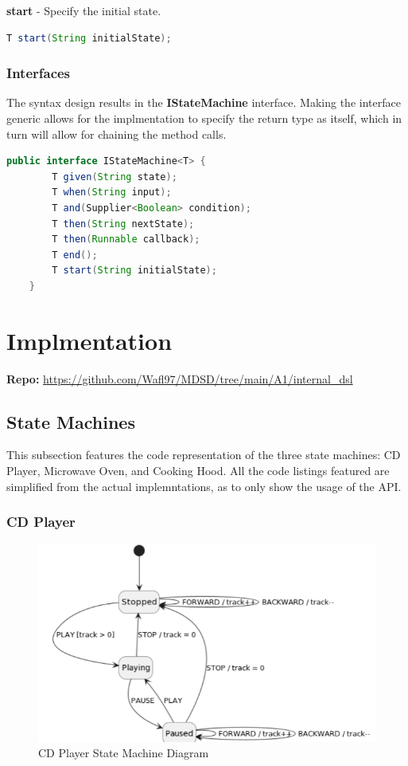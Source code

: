 \documentclass{article}
\begin{document}
\textbf{start} - Specify the initial state.
\begin{lstlisting}[language=java]
    T start(String initialState);
\end{lstlisting}

\subsubsection{Interfaces}

The syntax design results in the \textbf{IStateMachine} interface. Making the interface generic allows for the implmentation to specify the return type as itself, which in turn will allow for chaining the method calls.

\begin{lstlisting}[language=java, caption={State Machine Interface}, captionpos=b]
    public interface IStateMachine<T> {
        T given(String state);
        T when(String input);
        T and(Supplier<Boolean> condition);
        T then(String nextState);
        T then(Runnable callback);
        T end();
        T start(String initialState);
    }
\end{lstlisting}

\section{Implmentation}

\textbf{Repo:} \url{https://github.com/Wafl97/MDSD/tree/main/A1/internal_dsl}



\subsection{State Machines}

This subsection features the code representation of the three state machines: CD Player, Microwave Oven, and Cooking Hood. All the code listings featured are simplified from the actual implemntations, as to only show the usage of the API.

\subsubsection{CD Player}

\begin{figure}[H]
    \centering
    \includegraphics[scale=.75]{./figures/player.PNG}
    \caption{CD Player State Machine Diagram}
\end{figure}
\end{document}
